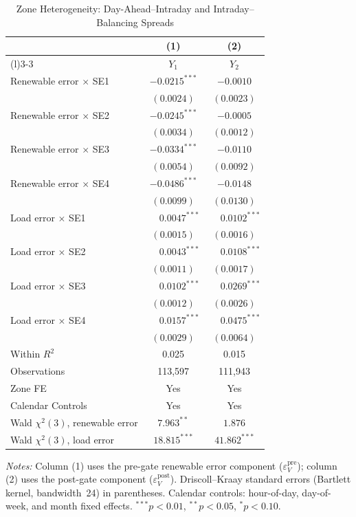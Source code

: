 \documentclass{article}
\begin{document}
\begin{table}[htbp]
\centering
\caption{Zone Heterogeneity: Day-Ahead--Intraday and Intraday--Balancing Spreads}
\label{tab:5}
\begin{threeparttable}
\begin{tabularx}{\linewidth}{>{\raggedright\arraybackslash}Xcc}
\toprule
 & (1) & (2) \\
\cmidrule(r){2-2}\cmidrule(l){3-3}
 & $Y_1$ & $Y_2$ \\
\midrule
Renewable error $\times$ SE1 & $-0.0215^{***}$ & $-0.0010$ \\
 & $(0.0024)$ & $(0.0023)$ \\[0.4ex]
Renewable error $\times$ SE2 & $-0.0245^{***}$ & $-0.0005$ \\
 & $(0.0034)$ & $(0.0012)$ \\[0.4ex]
Renewable error $\times$ SE3 & $-0.0334^{***}$ & $-0.0110$ \\
 & $(0.0054)$ & $(0.0092)$ \\[0.4ex]
Renewable error $\times$ SE4 & $-0.0486^{***}$ & $-0.0148$ \\
 & $(0.0099)$ & $(0.0130)$ \\[0.4ex]
Load error $\times$ SE1 & $\phantom{-}0.0047^{***}$ & $\phantom{-}0.0102^{***}$ \\
 & $(0.0015)$ & $(0.0016)$ \\[0.4ex]
Load error $\times$ SE2 & $\phantom{-}0.0043^{***}$ & $\phantom{-}0.0108^{***}$ \\
 & $(0.0011)$ & $(0.0017)$ \\[0.4ex]
Load error $\times$ SE3 & $\phantom{-}0.0102^{***}$ & $\phantom{-}0.0269^{***}$ \\
 & $(0.0012)$ & $(0.0026)$ \\[0.4ex]
Load error $\times$ SE4 & $\phantom{-}0.0157^{***}$ & $\phantom{-}0.0475^{***}$ \\
 & $(0.0029)$ & $(0.0064)$ \\
\midrule
Within $R^2$ & 0.025 & 0.015 \\
Observations & 113,597 & 111,943 \\
Zone FE & Yes & Yes \\
Calendar Controls & Yes & Yes \\
Wald $\chi^2(3)$, renewable error & $7.963^{**}$ & $1.876$ \\
Wald $\chi^2(3)$, load error & $18.815^{***}$ & $41.862^{***}$ \\
\bottomrule
\end{tabularx}
\begin{tablenotes}[flushleft]
\footnotesize
\item \textit{Notes:} Column (1) uses the pre-gate renewable error component ($\varepsilon_V^{\mathrm{pre}}$); column (2) uses the post-gate component ($\varepsilon_V^{\mathrm{post}}$). Driscoll--Kraay standard errors (Bartlett kernel, bandwidth~24) in parentheses. Calendar controls: hour-of-day, day-of-week, and month fixed effects. $^{***}p<0.01$, $^{**}p<0.05$, $^{*}p<0.10$.
\end{tablenotes}
\end{threeparttable}
\end{table}
\end{document}
